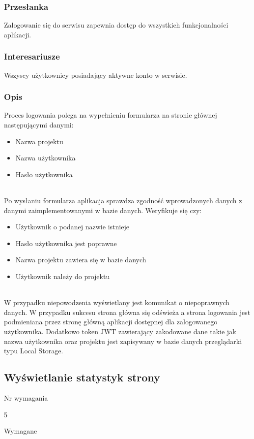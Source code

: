 \documentclass[eng,printmode]{mgr}
\begin{document}
\subsubsection{Przesłanka}
Zalogowanie się do serwisu zapewnia dostęp do wszystkich funkcjonalności aplikacji.

\subsubsection{Interesariusze}
Wszyscy użytkownicy posiadający aktywne konto w serwisie.

\subsubsection{Opis}
Proces logowania polega na wypełnieniu formularza na stronie głównej następującymi danymi:
\begin{itemize}
	\item[--] Nazwa projektu
	\item[--] Nazwa użytkownika
	\item[--] Hasło użytkownika
\end{itemize}
\ \\
Po wysłaniu formularza aplikacja sprawdza zgodność wprowadzonych danych z danymi zaimplementowanymi w bazie danych. Weryfikuje się czy:
\begin{itemize}
	\item[--] Użytkownik o podanej nazwie istnieje
	\item[--] Hasło użytkownika jest poprawne
	\item[--] Nazwa projektu zawiera się w bazie danych
	\item[--] Użytkownik należy do projektu
\end{itemize}
\ \\
W przypadku niepowodzenia wyświetlany jest komunikat o niepoprawnych danych. W przypadku sukcesu strona główna się odświeża a strona logowania jest podmieniana przez stronę główną aplikacji dostępnej dla zalogowanego użytkownika. Dodatkowo token JWT zawierający zakodowane dane takie jak nazwa użytkownika oraz projektu jest zapisywany w bazie danych przeglądarki typu Local Storage\cite{Keyword_LocaLStorage}.

\subsection{Wyświetlanie statystyk strony}
\begin{labeling}{Nr wymagania}
\item [Nr wymagania:] 5
\item [Priorytet:] Wymagane
\end{labeling}
\end{document}
